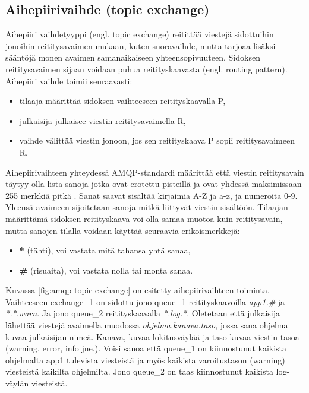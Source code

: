 \subsection{Aihepiirivaihde (topic exchange)}
Aihepiiri vaihdetyyppi (engl. topic exchange) reitittää viestejä sidottuihin jonoihin reititysavaimen mukaan, kuten suoravaihde, mutta tarjoaa lisäksi sääntöjä monen avaimen samanaikaiseen yhteensopivuuteen. Sidoksen reititysavaimen sijaan voidaan puhua reitityskaavasta (engl. routing pattern). Aihepiiri vaihde toimii seuraavasti:
\begin{itemize}
	\item tilaaja määrittää sidoksen vaihteeseen reitityskaavalla P,
	\item julkaisija julkaisee viestin reititysavaimella R,
	\item vaihde välittää viestin jonoon, jos sen reitityskaava P sopii reititysavaimeen R.
\end{itemize}
Aihepiirivaihteen yhteydessä AMQP-standardi määrittää että viestin reititysavain täytyy olla lista sanoja jotka ovat erotettu pisteillä ja ovat yhdessä maksimissaan 255 merkkiä pitkä \mbox{\cite[s.~35]{AMQP-specification}}. Sanat saavat sisältää kirjaimia A-Z ja a-z, ja numeroita 0-9. Yleensä avaimeen sijoitetaan sanoja mitkä liittyvät viestin sisältöön. Tilaajan määrittämä sidoksen reitityskaava voi olla samaa muotoa kuin reititysavain, mutta sanojen tilalla voidaan käyttää seuraavia erikoismerkkejä:
\begin{itemize}
	\item \textbf{*} (tähti), voi vastata mitä tahansa yhtä sanaa,
	\item \textbf{\#} (risuaita), voi vastata nolla tai monta sanaa. \mbox{\cite[s.~27]{AMQP-specification}}
\end{itemize}

Kuvassa \ref{fig:amqp-topic-exchange} on esitetty aihepiirivaihteen toiminta. Vaihteeseen exchange\_1 on sidottu jono queue\_1 reitityskaavoilla \emph{app1.\#} ja \emph{*.*.warn}. Ja jono queue\_2 reitityskaavalla \emph{*.log.*}. Oletetaan että julkaisija lähettää viestejä avaimella muodossa \emph{ohjelma.kanava.taso}, jossa sana ohjelma kuvaa julkaisijan nimeä. Kanava, kuvaa lokitusväylää ja taso kuvaa viestin tasoa (warning, error, info jne.). Voisi sanoa että queue\_1 on kiinnostunut kaikista ohjelmalta app1 tulevista viesteistä ja myös kaikista varoitustason (warning) viesteistä kaikilta ohjelmilta. Jono queue\_2 on taas kiinnostunut kaikista log-väylän viesteistä.

